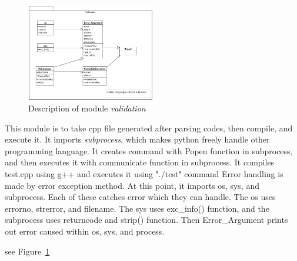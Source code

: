 \documentclass[conference]{IEEEtran}
\begin{document}
\begin{figure}[ht]
\centering
\includegraphics[width=0.5\textwidth]{./figures/comp_exec.png}
\caption{Description of module \textit{validation}}
\label{validation}
\end{figure}
This module is to take cpp file generated after parsing codes, then compile, and execute it.
It imports \textit{subprocess}, which makes python freely handle other programming language.
It creates command with Popen function in subprocess, and then executes it with communicate function in subprocess.
It compiles test.cpp using g++ and executes it using "./test" command
Error handling is made by error exception method. 
At this point, it imports os, sys, and subprocess. 
Each of these catches error which they can handle.
The os uses errorno, strerror, and filename.
The sys uses exc\_info() function, and the subprocess uses returncode and strip() function.
Then Error\_Argument prints out error caused within os, sys, and process.

see Figure~\ref{validation}
\end{document}

